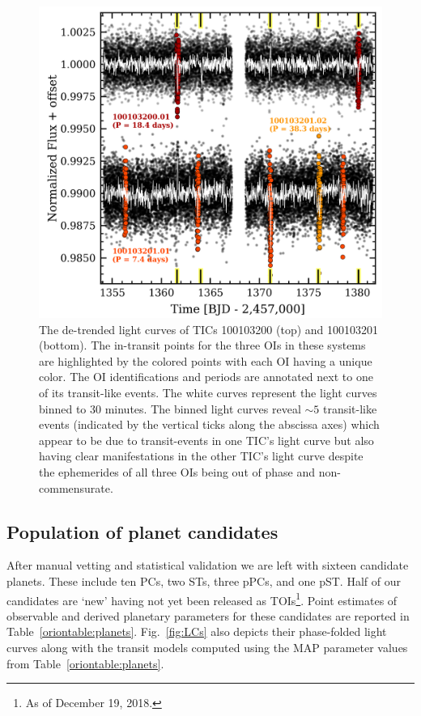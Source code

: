 \begin{figure}
  \centering
  \includegraphics[width=0.8\hsize]{figures/TIC300_LC.png}
  \caption[Example of scattered light within the common aperture of nearby TICs.]
      {The de-trended light curves of TICs 100103200 (top) and 100103201 (bottom).
    The in-transit points for the three
    OIs in these systems are highlighted by the colored points with each OI having a unique color.
    The OI identifications and periods are annotated next to one of its transit-like events.
    The white curves represent the light curves binned to 30 minutes. The binned light curves reveal
    $\sim 5$ transit-like events (indicated by the vertical ticks along the abscissa axes) which appear to be
    due to transit-events in one TIC's light curve but also having clear manifestations in the other
    TIC's light curve despite the ephemerides of all three OIs being out of phase and non-commensurate.}
  \label{fig:tic300}
\end{figure}

\subsection{Population of planet candidates}
After manual vetting and statistical validation we are left with sixteen candidate planets. These include
ten PCs, two STs, three pPCs, and one pST. Half of our candidates are `new' having not yet been released
as TOIs\footnote{As of December 19, 2018.}.
Point estimates of observable and derived planetary parameters for these candidates are reported in
Table~\ref{oriontable:planets}.  Fig.~\ref{fig:LCs} also depicts their phase-folded light curves along with
the transit models computed using the MAP parameter values from Table~\ref{oriontable:planets}. \\

